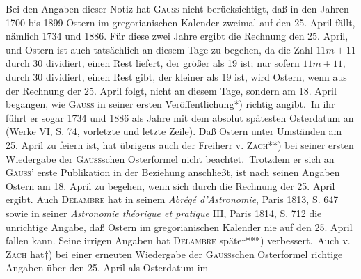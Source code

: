 \noindent\hspace*{\parindent}Bei den Angaben dieser Notiz hat \textsc{Gauss} nicht berücksichtigt, daß in den Jahren 1700 bis 1899 Ostern im gregorianischen Kalender zweimal auf den 25. April fällt, nämlich 1734 und 1886. Für diese zwei Jahre ergibt die Rechnung den 25. April, und Ostern ist auch tatsächlich an diesem Tage zu begehen, da die Zahl $11m+11$ durch 30 dividiert, einen Rest liefert, der größer als 19 ist; nur sofern $11m+11$, durch 30 dividiert, einen Rest gibt, der kleiner als 19 ist, wird Ostern, wenn aus der Rechnung der 25. April folgt, nicht an diesem Tage, sondern am 18. April begangen, wie \textsc{Gauss} in seiner ersten Veröffentlichung*) richtig angibt.\begingroup\renewcommand{\thefootnote}{}\endgroup\ In ihr führt er sogar 1734 und 1886 als Jahre mit dem absolut spätesten Osterdatum an (Werke VI, S. 74, vorletzte und letzte Zeile). Daß Ostern unter Umständen am 25. April zu feiern ist, hat übrigens auch der Freiherr v. \textsc{Zach}**) bei seiner ersten Wiedergabe der \textsc{Gauss}schen Osterformel nicht beachtet.\begingroup\renewcommand{\thefootnote}{}\endgroup\ Trotzdem er sich an \textsc{Gauss}' erste Publikation in der Beziehung anschließt, ist nach seinen Angaben Ostern  am 18. April zu begehen, wenn sich durch die Rechnung der 25. April ergibt. Auch \textsc{Delambre} hat in seinem \textit{Abrégé d'Astronomie}, Paris 1813, S. 647 sowie in seiner \textit{Astronomie théorique et pratique} III, Paris 1814, S. 712 die unrichtige Angabe, daß Ostern im gregorianischen Kalender nie auf den 25. April fallen kann. Seine irrigen Angaben hat \textsc{Delambre} später***) verbessert.\begingroup\renewcommand{\thefootnote}{}\endgroup\ Auch v. \textsc{Zach} hat$\dagger$) bei einer erneuten Wiedergabe der \textsc{Gauss}schen Osterformel richtige Angaben über den 25. April als Osterdatum im 